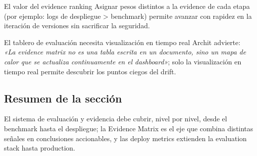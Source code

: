 \begin{knowledgebox}{El valor del evidence ranking}
Asignar pesos distintos a la evidence de cada etapa (por ejemplo: logs de despliegue > benchmark) permite avanzar con rapidez en la iteración de versiones sin sacrificar la seguridad.
\end{knowledgebox}

\begin{importantbox}{El tablero de evaluación necesita visualización en tiempo real}
Archit advierte: \textit{«La evidence matrix no es una tabla escrita en un documento, sino un mapa de calor que se actualiza continuamente en el dashboard»}; solo la visualización en tiempo real permite descubrir los puntos ciegos del drift.
\end{importantbox}

\subsection{Resumen de la sección}

El sistema de evaluación y evidencia debe cubrir, nivel por nivel, desde el benchmark hasta el despliegue; la Evidence Matrix es el eje que combina distintas señales en conclusiones accionables, y las deploy metrics extienden la evaluation stack hasta production.
